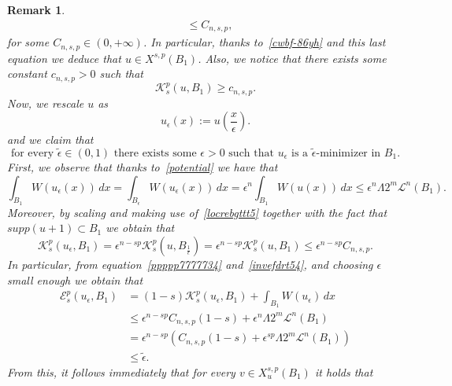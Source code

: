 \documentclass[12pt]{article}
\numberwithin{equation}{section}
\newtheorem{rem}[thm]{Remark}
\renewcommand{\leq}{\leqslant}
\renewcommand{\geq}{\geqslant}
\begin{document}
\begin{rem}
\begin{equation}
\begin{split}
&\leq C_{n,s,p},
\end{split}
\end{equation}
for some $C_{n,s,p}\in (0,+\infty)$. In particular, thanks to~\eqref{cwbf-86yh} and this last equation we deduce that $u\in X^{s,p}(B_1)$. Also, we notice that there exists some constant $c_{n,s,p}>0$ such that
\begin{equation}\label{ioprefvv}
\mathcal{K}_s^p(u,B_1)\geq c_{n,s,p}. 
\end{equation}
Now, we rescale $u$ as 
\begin{equation}
u_\epsilon(x):=u\left(\frac{x}{\epsilon}\right). 
\end{equation}
and we claim that 
\begin{equation}\label{im-btre54778}
\mbox{for every $\tilde{\epsilon}\in (0,1)$ there exists some $\epsilon>0$ such that $u_\epsilon$ is a $\tilde{\epsilon}$-minimizer in $B_1$}. 
\end{equation}
First, we observe that thanks to~\eqref{potential} we have that 
\begin{equation}\label{ppppp7777734}
\int_{B_1}W\left(u_{\epsilon}(x)\right)\,dx=\int_{B_\epsilon}W\left(u_{\epsilon}(x)\right)\,dx 
=\epsilon^n\int_{B_1} W(u(x))\,dx
\leq \epsilon^n \Lambda 2^m \mathcal{L}^n\left(B_1\right).   
\end{equation}
Moreover, by scaling and making use of~\eqref{locrebgttt5} together with the fact that $supp(u+1)\subset B_1$ we obtain that
\begin{equation}\label{invefdrt54}
\mathcal{K}_s^p \left(u_\epsilon,B_1\right)=\epsilon^{n-sp} \mathcal{K}_s^p\left(u,B_{\frac{1}{\epsilon}}\right)=\epsilon^{n-sp} \mathcal{K}_s^p(u,B_1)
\leq  \epsilon^{n-sp} C_{n,s,p}. 
\end{equation}
In particular, from equation~\eqref{ppppp7777734} and~\eqref{invefdrt54}, and choosing $\epsilon$ small enough we obtain that  
\begin{equation*}
\begin{split}
\mathcal{E}_s^p(u_\epsilon,B_1)&=(1-s)\mathcal{K}_s^p(u_\epsilon,B_1)+\int_{B_1}W\left(u_\epsilon\right)\,dx\\
&\leq \epsilon^{n-sp}C_{n,s,p}(1-s)+ \epsilon^n \Lambda 2^m\mathcal{L}^n(B_1)\\
&=\epsilon^{n-sp}\left(C_{n,s,p}(1-s)+\epsilon^{sp} \Lambda 2^m\mathcal{L}^n(B_1)\right)\\
&\leq \tilde{\epsilon}. 
\end{split}
\end{equation*}
From this, it follows immediately that for every $v\in X_u^{s,p}(B_1)$ it holds that 

\end{rem}
\end{document}
